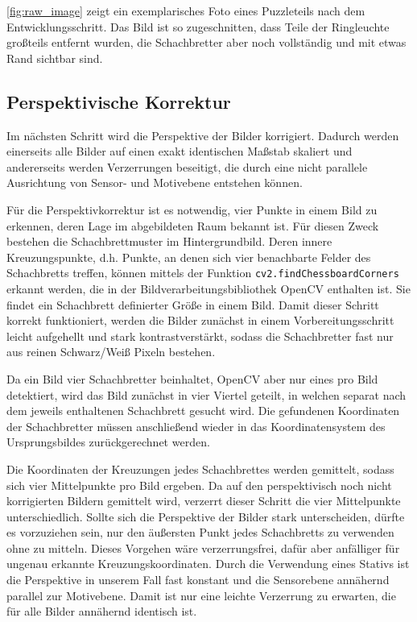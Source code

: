 \autoref{fig:raw_image} zeigt ein exemplarisches Foto eines Puzzleteils nach dem Entwicklungsschritt.
Das Bild ist so zugeschnitten, dass Teile der Ringleuchte großteils entfernt wurden, die Schachbretter
aber noch vollständig und mit etwas Rand sichtbar sind.

\subsection[Perspektivische Korrektur]{Perspektivische Korrektur }

Im nächsten Schritt wird die Perspektive der Bilder korrigiert. Dadurch
werden einerseits alle Bilder auf einen exakt identischen Maßstab
skaliert und andererseits werden Verzerrungen beseitigt, die durch eine
nicht parallele Ausrichtung von Sensor- und Motivebene entstehen können.

Für die Perspektivkorrektur ist es notwendig, vier Punkte in einem Bild
zu erkennen, deren Lage im abgebildeten Raum bekannt ist. Für diesen
Zweck bestehen die Schachbrettmuster im Hintergrundbild. Deren innere
Kreuzungspunkte, d.h. Punkte, an denen sich vier benachbarte Felder des
Schachbretts treffen, können mittels der Funktion
\texttt{cv2.findChessboardCorners} erkannt werden, die in der
Bildverarbeitungsbibliothek OpenCV enthalten ist. Sie findet ein
Schachbrett definierter Größe in einem Bild. Damit dieser Schritt
korrekt funktioniert, werden die Bilder zunächst in einem
Vorbereitungsschritt leicht aufgehellt und stark kontrastverstärkt,
sodass die Schachbretter fast nur aus reinen Schwarz/Weiß Pixeln
bestehen.

Da ein Bild vier Schachbretter beinhaltet, OpenCV aber nur eines pro
Bild detektiert, wird das Bild zunächst in vier Viertel geteilt, in
welchen separat nach dem jeweils enthaltenen Schachbrett gesucht wird.
Die gefundenen Koordinaten der Schachbretter müssen anschließend wieder
in das Koordinatensystem des Ursprungsbildes zurückgerechnet werden.

Die Koordinaten der Kreuzungen jedes Schachbrettes werden gemittelt,
sodass sich vier Mittelpunkte pro Bild ergeben. Da auf den
perspektivisch noch nicht korrigierten Bildern gemittelt wird, verzerrt
dieser Schritt die vier Mittelpunkte unterschiedlich. Sollte sich die
Perspektive der Bilder stark unterscheiden, dürfte es vorzuziehen sein,
nur den äußersten Punkt jedes Schachbretts zu verwenden ohne zu mitteln.
Dieses Vorgehen wäre verzerrungsfrei, dafür aber anfälliger für ungenau erkannte
Kreuzungskoordinaten. Durch die Verwendung eines Stativs ist die
Perspektive in unserem Fall fast konstant und die Sensorebene annähernd
parallel zur Motivebene. Damit ist nur eine leichte Verzerrung zu
erwarten, die für alle Bilder annähernd identisch ist.


